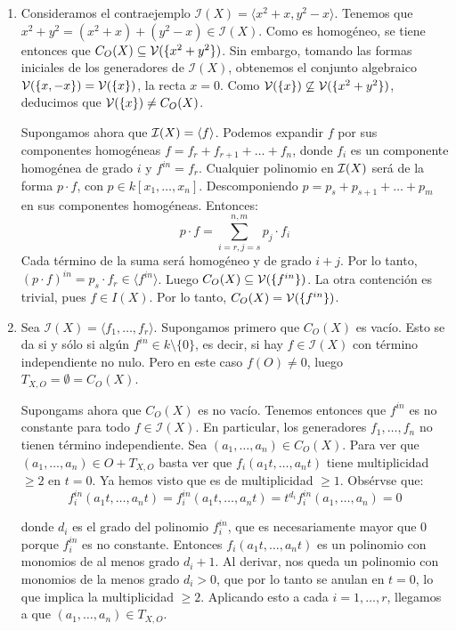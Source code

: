 \documentclass[twoside]{article}
\begin{document}
\begin{solucion}\mbox{}
\begin{enumerate}
	\item Consideramos el contraejemplo $\mathcal{I}(X) = \langle x^2+x,y^2-x\rangle$. Tenemos que $x^2+y^2=(x^2+x)+(y^2-x)\in\mathcal{I}(X)$. Como es homogéneo, se tiene entonces que $C_O(X) \subseteq \mathcal{V}(\{x^2+y^2\})$. Sin embargo, tomando las formas iniciales de los generadores de $\mathcal{I}(X)$, obtenemos el conjunto algebraico $\mathcal{V}(\{x,-x\})=\mathcal{V}(\{x\})$, la recta $x=0$. Como $\mathcal{V}(\{x\}) \not\subseteq \mathcal{V}(\{x^2+y^2\})$, deducimos que $\mathcal{V}(\{x\}) \neq C_O(X)$.

	Supongamos ahora que $\mathcal{I}(X)=\langle f \rangle$. Podemos expandir $f$ por sus componentes homogéneas $f=f_r+f_{r+1}+\dots+f_n$, donde $f_i$ es un componente homogénea de grado $i$ y $f^{in}=f_r$. Cualquier polinomio en $\mathcal{I}(X)$ será de la forma $p\cdot f$, con $p \in k[x_1,\dots,x_n]$. Descomponiendo $p=p_s+p_{s+1}+\dots+p_m$ en sus componentes homogéneas. Entonces:
	\[ p\cdot f = \sum_{i=r,j=s}^{n,m} p_j \cdot f_i \]
	Cada término de la suma será homogéneo y de grado $i+j$. Por lo tanto, $(p \cdot f)^{in} = p_s \cdot f_r \in \langle f^{in} \rangle$. Luego $C_O(X) \subseteq \mathcal{V}(\{f^{in}\})$. La otra contención es trivial, pues $f \in I(X)$. Por lo tanto, $C_O(X) = \mathcal{V}(\{f^{in}\})$.

	\item Sea $\mathcal{I}(X)=\langle f_1,\dots,f_r \rangle$. Supongamos primero que $C_O(X)$ es vacío. Esto se da si y sólo si algún $f^{in} \in k \setminus \{0\}$, es decir, si hay $f \in \mathcal{I}(X)$ con término independiente no nulo. Pero en este caso $f(O) \neq 0$, luego $T_{X,O} = \emptyset = C_O(X)$.

	Supongams ahora que $C_O(X)$ es no vacío. Tenemos entonces que $f^{in}$ es no constante para todo $f \in \mathcal{I}(X)$. En particular, los generadores $f_1,\dots,f_n$ no tienen término independiente. Sea $(a_1,\dots,a_n) \in C_O(X)$. Para ver que $(a_1,\dots,a_n) \in O + T_{X,O}$ basta ver que $f_i(a_1t,\dots,a_nt)$ tiene multiplicidad $≥2$ en $t=0$. Ya hemos visto que es de multiplicidad $≥1$. Obsérvse que:
	\[ f_i^{in}(a_1t,\dots,a_nt) = f_i^{in}(a_1t,\dots,a_nt) = t^{d_i} f_i^{in}(a_1,\dots,a_n) = 0 \]

	donde $d_i$ es el grado del polinomio $f_i^{in}$, que es necesariamente mayor que $0$ porque $f_i^{in}$ es no constante. Entonces $f_i(a_1t,\dots,a_nt)$ es un polinomio con monomios de al menos grado $d_i + 1$. Al derivar, nos queda un polinomio con monomios de la menos grado $d_i > 0$, que por lo tanto se anulan en $t=0$, lo que implica la multiplicidad $≥2$. Aplicando esto a cada $i=1,\dots,r$, llegamos a que $(a_1,\dots,a_n) \in T_{X,O}$.


\end{enumerate}
\end{solucion}
\end{document}
